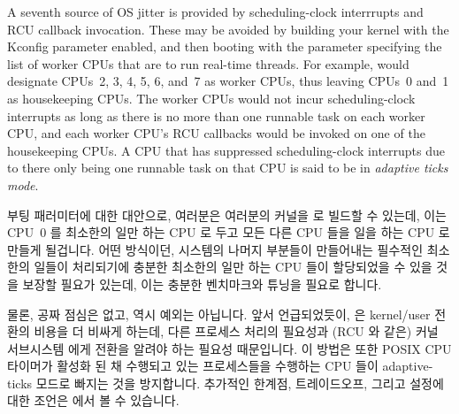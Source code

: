 A seventh source of OS jitter is provided by
scheduling-clock interrrupts and RCU callback invocation.
These may be avoided by building your kernel with the
 Kconfig parameter enabled, and then booting
with the  parameter specifying the list of
worker CPUs that are to run real-time threads.
For example,  would designate CPUs~2, 3, 4, 5, 6, and~7
as worker CPUs, thus leaving CPUs~0 and~1 as housekeeping CPUs.
The worker CPUs would not incur scheduling-clock interrupts as long
as there is no more than one runnable task on each worker CPU,
and each worker CPU's RCU callbacks would be invoked on one of the
housekeeping CPUs.
A CPU that has suppressed scheduling-clock interrupts due to there
only being one runnable task on that CPU is said to be in
\emph{adaptive ticks mode}.
\fi

 부팅 패러미터에 대한 대안으로, 여러분은 여러분의 커널을
 로 빌드할 수 있는데, 이는 CPU~0 를 최소한의 일만 하는 CPU
로 두고 모든 다른 CPU 들을 일을 하는 CPU 로 만들게 될겁니다.
어떤 방식이던, 시스템의 나머지 부분들이 만들어내는 필수적인 최소한의 일들이
처리되기에 충분한 최소한의 일만 하는 CPU 들이 할당되었을 수 있을 것을 보장할
필요가 있는데, 이는 충분한 벤치마크와 튜닝을 필요로 합니다.

물론, 공짜 점심은 없고,  역시 예외는 아닙니다.
앞서 언급되었듯이,  은 kernel/user 전환의 비용을 더 비싸게
하는데, 다른 프로세스 처리의 필요성과 (RCU 와 같은) 커널 서브시스템 에게 전환을
알려야 하는 필요성 때문입니다.
이 방법은 또한 POSIX CPU 타이머가 활성화 된 채 수행되고 있는 프로세스들을
수행하는 CPU 들이 adaptive-ticks 모드로 빠지는 것을 방지합니다.
추가적인 한계점, 트레이드오프, 그리고 설정에 대한 조언은
 에서 볼 수 있습니다.

